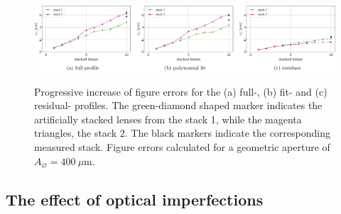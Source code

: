 \begin{refsection}

\begin{figure}[t]
    \centering
    {\includegraphics[width=1.\linewidth]{figures/ch04b/stacking_errors.pdf}}
    \caption[Accumulative figure errors]{Progressive increase of figure errors for the (a) full-, (b) fit- and (c) residual- profiles. The green-diamond shaped marker indicates the artificially stacked lenses from the stack 1, while the magenta triangles, the stack 2. The black markers indicate the corresponding measured stack. Figure errors calculated for a geometric aperture of $A_{\diameter}=400~\mu\text{m}$.}
    \label{fig:stacking_errors}
\end{figure}

\subsection{The effect of optical imperfections}\label{section:discussion_imperfections}


\end{refsection}
